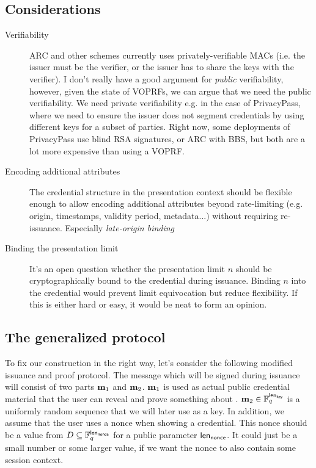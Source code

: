 
\subsection{Considerations}
\begin{description}
    \item[Verifiability] ARC and other schemes currently uses privately-verifiable MACs (i.e. the issuer must be the verifier, or the issuer has to share the keys with the verifier). I don't really have a good argument for \emph{public} verifiability, however, given the state of VOPRFs, we can argue that we need the public verifiability. We need private verifiability e.g. in the case of PrivacyPass, where we need to ensure the issuer does not segment credentials by using different keys for a subset of parties. Right now, some deployments of PrivacyPass use blind RSA signatures, or ARC with BBS, but both are a lot more expensive than using a VOPRF. 
    \item[Encoding additional attributes] The credential structure in the presentation context should be flexible enough to allow encoding additional attributes beyond rate-limiting (e.g. origin, timestamps, validity period, metadata...) without requiring re-issuance. Especially \emph{late-origin binding} 
    \item[Binding the presentation limit] It's an open question whether the presentation limit $n$ should be cryptographically bound to the credential during issuance. Binding $n$ into the credential would prevent limit equivocation but reduce flexibility. If this is either hard or easy, it would be neat to form an opinion. 

\end{description}

\subsection{The generalized protocol}
\label{generalized_protocol}
To fix our construction in the right way, let's consider the following modified issuance and proof protocol. The message which will be signed during issuance will consist of two parts $\mathbf{m}_1$ and $\mathbf{m}_2$. $\mathbf{m}_1$ is used as actual public credential material that the user can reveal and prove something about . $\mathbf{m}_2\in \mathbb{F}_q^{\mathsf{len}_{\mathsf{key}}}$ is a uniformly random sequence  that we will later use as a key. In addition, we assume that the user uses a nonce when showing a credential. This nonce should be a value from  $D\subseteq \mathbb{F}_q^{\mathsf{len}_{\mathsf{nonce}}}$ for a public parameter $\mathsf{len}_{\mathsf{nonce}}$. It could just be a small number or some larger value, if we want the nonce to also contain some session context. 

